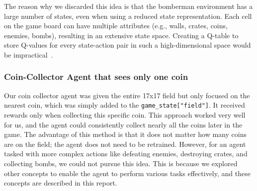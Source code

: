 The reason why we discarded this idea is that the bomberman environment has a large number of states, even when using a reduced state representation. 
Each cell on the game board can have multiple attributes (e.g., walls, crates, coins, enemies, bombs), resulting in an extensive state space. 
Creating a Q-table to store Q-values for every state-action pair in such a high-dimensional space would be impractical~\cite{Onl:qtabledis}.


\subsubsection{Coin-Collector Agent that sees only one coin}

Our coin collector agent was given the entire 17x17 field but only focused on the nearest coin, which was simply added to the \verb|game_state["field"]|. 
It received rewards only when collecting this specific coin. This approach worked very well for us, and the agent could consistently collect nearly 
all the coins later in the game. The advantage of this method is that it does not matter how many coins are on the field; the agent does not need to be 
retrained. However, for an agent tasked with more complex actions like defeating enemies, destroying crates, and collecting bombs, we could not 
pursue this idea. This is because we explored other concepts to enable the agent to perform various tasks effectively, and these concepts are described in this report.